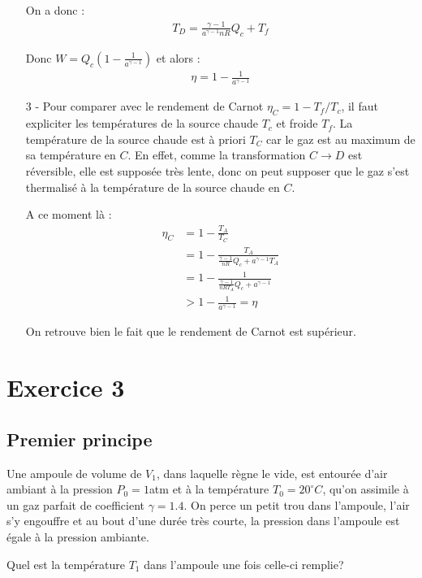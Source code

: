 \documentclass{report}
\begin{document}
\begin{itemize}
On a donc :
\begin{align*}
	T_D = \frac{\gamma-1}{a^{\gamma-1}nR}Q_c+T_f
\end{align*}

Donc $W=Q_c\left( 1-\frac{1}{a^{\gamma-1}}\right) $ et alors :
\begin{align*}
	\eta= 1-\frac{1}{a^{\gamma-1}}
\end{align*}

	\item[3 -] Pour comparer avec le rendement de Carnot $\eta_C=1-T_f/T_c$, il faut expliciter les températures de la source chaude $T_c$ et froide $T_f$. La température de la source chaude est à priori $T_C$ car le gaz est au maximum de sa température en $C$. En effet, comme la transformation $C\longrightarrow D$ est réversible, elle est supposée très lente, donc on peut supposer que le gaz s'est thermalisé à la température de la source chaude en $C$. 
	
	A ce moment là :
	\begin{align*}
		\eta_C&=1-\frac{T_A}{T_C}\\
		&=1-\frac{T_A}{\frac{\gamma-1}{nR}Q_c+a^{\gamma-1}T_A}\\
		&=1-\frac{1}{\frac{\gamma-1}{nRT_A}Q_c+a^{\gamma-1}}\\
		&>1-\frac{1}{a^{\gamma-1}} = \eta
	\end{align*}

On retrouve bien le fait que le rendement de Carnot est supérieur.

\end{itemize}

\newpage

\section*{Exercice 3}

\subsection*{Premier principe}

Une ampoule de volume de $V_1$, dans laquelle règne le vide, est entourée d'air ambiant à la pression $P_{0} = 1$atm et à la température $T_{0}=20^{\circ}C$, qu'on assimile à un gaz parfait de coefficient $\gamma=1.4$. On perce un petit trou dans l'ampoule, l'air s'y engouffre et au bout d'une durée très courte, la pression dans l'ampoule est égale à la pression ambiante.

Quel est la température $T_{1}$ dans l'ampoule une fois celle-ci remplie?
\end{document}
